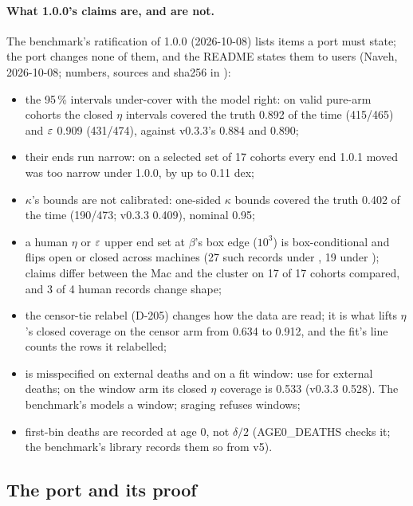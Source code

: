 \paragraph{What 1.0.0's claims are, and are not.} The benchmark's ratification of 1.0.0 (2026-10-08) lists items a
port must state; the port changes none of them, and the README states them to users (Naveh, 2026-10-08; numbers,
sources and sha256 in ):
\begin{itemize}[nosep]
  \item the 95\,\% intervals under-cover with the model right: on valid pure-arm cohorts the closed $\eta$ intervals
    covered the truth 0.892 of the time (415/465) and $\varepsilon$ 0.909 (431/474), against v0.3.3's 0.884 and 0.890;
  \item their ends run narrow: on a selected set of 17 cohorts every end 1.0.1 moved was too narrow under 1.0.0, by
    up to 0.11 dex;
  \item $\kappa$'s bounds are not calibrated: one-sided $\kappa$ bounds covered the truth 0.402 of the time (190/473;
    v0.3.3 0.409), nominal 0.95;
  \item a human $\eta$ or $\varepsilon$ upper end set at $\beta$'s box edge ($10^3$) is box-conditional and flips open or
    closed across machines (27 such records under , 19 under ); claims differ between
    the Mac and the cluster on 17 of 17 cohorts compared, and 3 of 4 human records change shape;
  \item the censor-tie relabel (D-205) changes how the data are read; it is what lifts $\eta$'s closed coverage on
    the censor arm from 0.634 to 0.912, and the fit's  line counts the rows it relabelled;
  \item {} is misspecified on external deaths and on a fit window: use  for external
    deaths; on the window arm its closed $\eta$ coverage is 0.533 (v0.3.3 0.528). The benchmark's  models a
    window; sraging refuses windows;
  \item first-bin deaths are recorded at age 0, not $\delta/2$ (AGE0\_DEATHS checks it; the benchmark's library
    records them so from v5).
\end{itemize}

\subsection{The port and its proof}\label{sec:pj-port}


